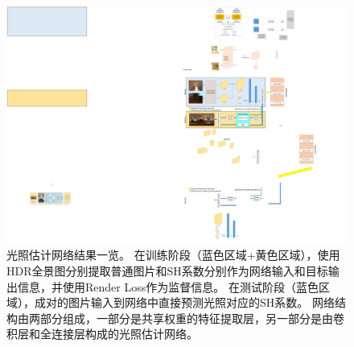 \begin{figure}
    \includegraphics[width=1.0\textwidth]{Img/fig-overview.pdf}
    \caption[光照估计网络结果一览]{
        \label{fig:overview}
        光照估计网络结果一览。
        在训练阶段（蓝色区域+黄色区域），使用HDR全景图分别提取普通图片和SH系数分别作为网络输入和目标输出信息，并使用Render Loss作为监督信息。
        在测试阶段（蓝色区域），成对的图片输入到网络中直接预测光照对应的SH系数。
        网络结构由两部分组成，一部分是共享权重的特征提取层，另一部分是由卷积层和全连接层构成的光照估计网络。
   }
\end{figure}